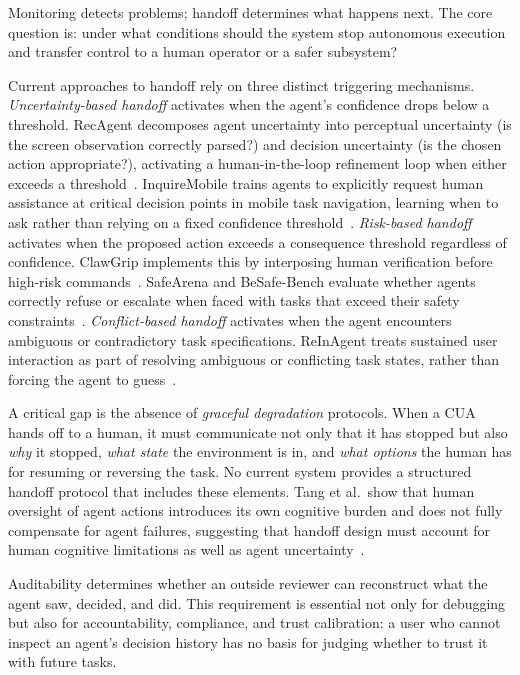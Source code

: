 Monitoring detects problems; handoff determines what happens next. The core question is: under what conditions should the system stop autonomous execution and transfer control to a human operator or a safer subsystem?

Current approaches to handoff rely on three distinct triggering mechanisms. \emph{Uncertainty-based handoff} activates when the agent's confidence drops below a threshold. RecAgent decomposes agent uncertainty into perceptual uncertainty (is the screen observation correctly parsed?) and decision uncertainty (is the chosen action appropriate?), activating a human-in-the-loop refinement loop when either exceeds a threshold~\cite{recagent2025}. InquireMobile trains agents to explicitly request human assistance at critical decision points in mobile task navigation, learning when to ask rather than relying on a fixed confidence threshold~\cite{inquiremobile2025}. \emph{Risk-based handoff} activates when the proposed action exceeds a consequence threshold regardless of confidence. ClawGrip implements this by interposing human verification before high-risk commands~\cite{shan2026dontletclawgrip}. SafeArena and BeSafe-Bench evaluate whether agents correctly refuse or escalate when faced with tasks that exceed their safety constraints~\cite{safearena2025,besafebench2026}. \emph{Conflict-based handoff} activates when the agent encounters ambiguous or contradictory task specifications. ReInAgent treats sustained user interaction as part of resolving ambiguous or conflicting task states, rather than forcing the agent to guess~\cite{reinagent2025}.

A critical gap is the absence of \emph{graceful degradation} protocols. When a CUA hands off to a human, it must communicate not only that it has stopped but also \emph{why} it stopped, \emph{what state} the environment is in, and \emph{what options} the human has for resuming or reversing the task. No current system provides a structured handoff protocol that includes these elements. Tang et al.\ show that human oversight of agent actions introduces its own cognitive burden and does not fully compensate for agent failures, suggesting that handoff design must account for human cognitive limitations as well as agent uncertainty~\cite{darkpatternsgui2025}.

Auditability determines whether an outside reviewer can reconstruct what the agent saw, decided, and did. This requirement is essential not only for debugging but also for accountability, compliance, and trust calibration: a user who cannot inspect an agent's decision history has no basis for judging whether to trust it with future tasks.

